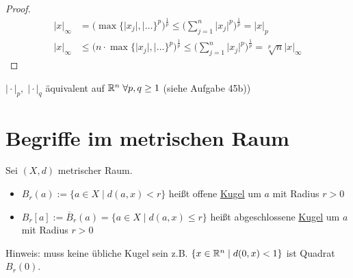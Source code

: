 \begin{proof}
    \begin{align*}
        \vert x \vert_{\infty} &=\big(\max \{ \vert x_j \vert, \vert \dots \}^p\big)^\frac{1}{p} \leq \bigg(\sum_{j=1}^{n} \vert x_j \vert^p \bigg)^\frac{1}{p} = \vert x \vert_p\\
        \vert x \vert_{\infty} &\leq \big( n\cdot \max\{ \vert x_j \vert, \vert \dots \}^p\big)^\frac{1}{p} \leq \bigg(\sum_{j=1}^{n} \vert x_j \vert^p \bigg)^\frac{1}{p} = \sqrt[p]{n}\vert x \vert_{\infty}
    \end{align*}\QEDA
\end{proof}

\begin{folg}
    $\vert \cdot \vert_p,\;\vert \cdot \vert_q$ äquivalent auf $\mathbb{R}^n\;\forall p,q \geq 1$ (siehe Aufgabe 45b))
\end{folg}

\section{Begriffe im metrischen Raum}

\begin{mydefn}
    Sei $(X,d)$ metrischer Raum.
    \begin{itemize}
    \item $B_r(a):= \{ a \in X \mid d(a,x) <r \}$ heißt offene \underline{Kugel} um $a$ mit Radius $r>0$
    \item $B_r[a]:= \overline{B}_r(a) = \{ a \in X \mid d(a,x) \leq r \}$ heißt abgeschlossene \underline{Kugel} um $a$ mit Radius $r>0$
    \end{itemize}
\end{mydefn}
Hinweis: muss keine übliche Kugel sein z.B. $\{x\in \mathbb{R}^n \mid d(0,x) < 1\}$ ist Quadrat $B_r(0)$.

